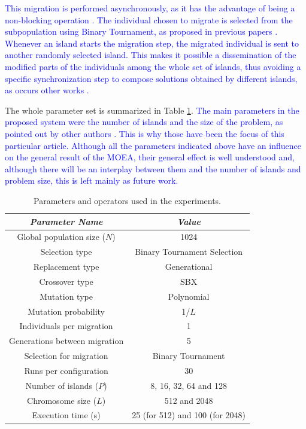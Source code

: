 \documentclass[preprint]{elsarticle}
\begin{document}
\textcolor{blue}{This migration
  is performed asynchronously, as it has the advantage of being a
  non-blocking operation \cite{TalbiUnified2018}. The individual
  chosen to migrate is selected from the subpopulation using Binary
  Tournament, as proposed in previous papers
  \cite{xiong2003parallel,Xiao03specialized}. Whenever an island
  starts the migration step, the migrated individual is sent to
  another randomly selected island. This makes it possible a
  dissemination of the modified parts of the individuals among the
  whole set of islands, thus avoiding a specific synchronization step
  to compose solutions obtained by different islands, as occurs other
  works \cite{Dorronsoro13superlinear}.}

 The whole parameter set is summarized in Table \ref{tab:parameters}. 
 \textcolor{blue}{The main parameters in the proposed system were the number of islands and the size
   of the problem, as pointed out by other authors 
   \cite{CaoZLL17,Dorronsoro13superlinear,DorronsoroPSO2018,Martens13asynchronous,Durillo08masterslave}. This is why those have been the focus of this particular
   article. Although all the parameters indicated above have an
   influence on the general result of the MOEA, their general effect
   is well understood and, although there will be an interplay between
 them and the number of islands and problem size, this is left mainly
 as future work.} 






\begin{table}
\begin{center}
\begin{tabular}{|c|c|}
\hline
{\em Parameter Name} & {\em Value} \\ \hline
Global population size ($N$) & 1024 \\ \hline
Selection type & Binary Tournament Selection \\ \hline
Replacement type & Generational \\ \hline 
Crossover type & SBX \\ \hline
Mutation  type & Polynomial\\ \hline
Mutation probability & 1/$L$ \\ \hline
Individuals per migration & 1 \\ \hline
Generations between migration & 5 \\ \hline
Selection for migration & Binary Tournament\\ \hline
Runs per configuration & 30 \\ \hline \hline
Number of islands ($P$) & 8, 16, 32, 64 and 128 \\ \hline
Chromosome size ($L$) & 512 and 2048 \\ \hline
Execution time (s) & 25 (for 512) and 100 (for 2048) \\ \hline \hline
\end{tabular}
\caption{Parameters and operators used in the experiments.}
\label{tab:parameters}
\end{center}
\end{table}
\end{document}
